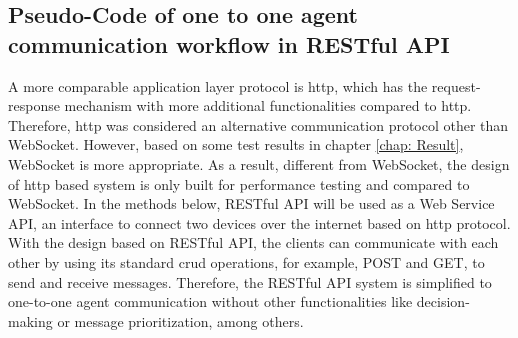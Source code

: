 \subsection{Pseudo-Code of one to one agent communication workflow in RESTful API}
A more comparable application layer protocol is \gls{http}, which has the request-response mechanism with more additional functionalities compared to \gls{http}. 
Therefore, \gls{http} was considered an alternative communication protocol other than WebSocket. 
However, based on some test results in chapter \ref{chap: Result}, WebSocket is more appropriate.
As a result, different from WebSocket, the design of \gls{http} based system is only built for performance testing and compared to WebSocket. In the methods below, RESTful API will be used as a Web Service API, an interface to connect two devices over the internet based on \gls{http} protocol. With the design based on RESTful API, the clients can communicate with each other by using its standard \gls{crud} operations, for example, POST and GET, to send and receive messages. 
Therefore, the RESTful API system is simplified to one-to-one agent communication without other functionalities like decision-making or message prioritization, among others.


